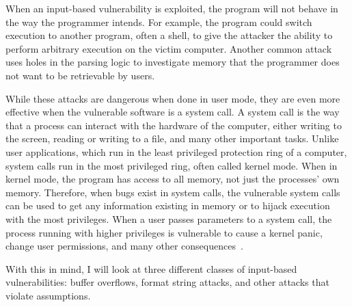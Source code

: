 When an input-based vulnerability is exploited, the program will not behave in the way the programmer intends.  For example, the program could switch execution to another program, often a shell, to give the attacker the ability to perform arbitrary execution on the victim computer.  Another common attack uses holes in the parsing logic to investigate memory that the programmer does not want to be retrievable by users.

While these attacks are dangerous when done in user mode, they are even more effective when the vulnerable software is a system call.  A system call is the way that a process can interact with the hardware of the computer, either writing to the screen, reading or writing to a file, and many other important tasks.  Unlike user applications, which run in the least privileged protection ring of a computer, system calls run in the most privileged ring, often called kernel mode.  When in kernel mode, the program has access to all memory, not just the processes' own memory.  Therefore, when bugs exist in system calls, the vulnerable system calls can be used to get any information existing in memory or to hijack execution with the most privileges.  When a user passes parameters to a system call, the process running with higher privileges is vulnerable to cause a kernel panic, change user permissions, and many other consequences~\cite{johnson2004finding}.

With this in mind, I will look at three different classes of input-based vulnerabilities: buffer overflows, format string attacks, and other attacks that violate assumptions.

